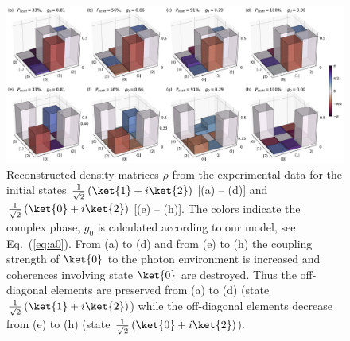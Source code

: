 \documentclass[12pt,
onecolumn,
superscriptaddress,
floatfix,
]{revtex4-2}
\begin{document}
\begin{figure}[b]
\includegraphics[width=\linewidth]{rho_phase_total.pdf}
\caption{\label{fig:rho}%
Reconstructed density matrices $\rho$ from the experimental data for the initial states 
$\frac{1}{\sqrt{2}}\left(\ket{1} + i\ket{2}\right)$ [(a) -- (d)] and $\frac{1}{\sqrt{2}}\left(\ket{0} + i\ket{2}\right)$ [(e) -- (h)]. The colors indicate the complex phase,
$g_0$ is calculated according to our model, see Eq.~(\ref{eq:a0}).
From (a) to (d) and from (e) to (h) the coupling strength of $\ket{0}$ to the photon environment is increased and coherences involving state $\ket{0}$ are destroyed.
Thus the off-diagonal elements are preserved from (a) to (d) (state 
$\frac{1}{\sqrt{2}}\left(\ket{1} + i\ket{2}\right)$) while the off-diagonal elements decrease from
 (e) to (h) (state $\frac{1}{\sqrt{2}}\left(\ket{0} + i\ket{2}\right)$).}
\end{figure}
\end{document}
